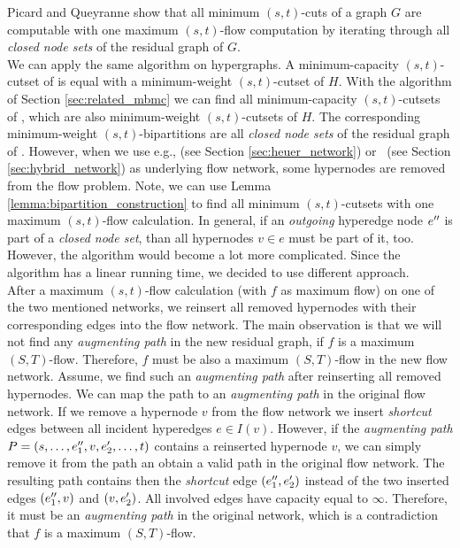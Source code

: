 Picard and Queyranne \cite{picard1980structure} show that all minimum $(s,t)$-cuts 
of a graph $G$ are computable with one maximum $(s,t)$-flow computation by 
iterating through all \emph{closed node sets} of the residual graph of $G$. \\
We can apply the same algorithm on hypergraphs. A minimum-capacity $(s,t)$-cutset of 
is equal with a minimum-weight $(s,t)$-cutset of $H$. With the algorithm
of Section \ref{sec:related_mbmc} we can find all minimum-capacity
$(s,t)$-cutsets of , which are also minimum-weight $(s,t)$-cutsets
of $H$. The corresponding minimum-weight $(s,t)$-bipartitions are all
\emph{closed node sets} of the residual graph of . 
However, when we use e.g.,  (see Section \ref{sec:heuer_network})
or \ShortHybrid~(see Section \ref{sec:hybrid_network}) as underlying flow network,
some hypernodes are removed from the flow problem. Note, we can use 
Lemma \ref{lemma:bipartition_construction} to find all minimum
$(s,t)$-cutsets with one maximum $(s,t)$-flow calculation. In general, if an
\emph{outgoing} hyperedge node $e''$ is part of a \emph{closed node set}, than
all hypernodes $v \in e$ must be part of it, too. However, the algorithm would 
become a lot more complicated. Since the algorithm has a linear running time, we decided
to use different approach. \\
After a maximum $(s,t)$-flow calculation (with $f$ as maximum flow)
on one of the two mentioned networks, we reinsert all removed hypernodes with
their corresponding edges into the flow network.
The main observation is that we will not find any \emph{augmenting path} in the
new residual graph, if $f$ is a maximum $(S,T)$-flow. Therefore, $f$ must be also a
maximum $(S,T)$-flow in the new flow network.
Assume, we find such an \emph{augmenting path} after reinserting all removed hypernodes.
We can map the path to an \emph{augmenting path} in the original flow network.
If we remove a hypernode $v$ from the flow network we insert \emph{shortcut} edges
between all incident hyperedges $e \in I(v)$. However, if the \emph{augmenting path} $P = (s,\ldots,e_1'',v,e_2',\ldots,t)$
contains a reinserted hypernode $v$, we can simply remove it from the path an obtain a valid
path in the original flow network. The resulting path contains then the \emph{shortcut} edge $(e_1'',e_2')$
instead of the two inserted edges $(e_1'',v)$ and $(v,e_2')$. All involved edges
have capacity equal to $\infty$. Therefore, it must be an \emph{augmenting path} in the 
original network, which is a contradiction that $f$ is a maximum $(S,T)$-flow.

